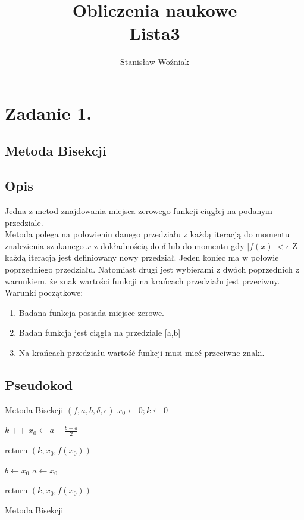 \documentclass[11pt, a4paper]{article}
\title{Obliczenia naukowe\\Lista3}
\author{Stanisław Woźniak}
\date{}
\begin{document}
    \maketitle
    \section{Zadanie 1.}
    \subsection{Metoda Bisekcji}
    \subsection{Opis}
    Jedna z metod znajdowania miejsca zerowego funkcji ciągłej na podanym przedziale.\\
    Metoda polega na połowieniu danego przedziału z każdą iteracją do momentu znalezienia szukanego $x$ z dokładnością do $\delta$ lub do momentu gdy $|f(x)| < \epsilon$
    Z każdą iteracją jest definiowany nowy przedział. Jeden koniec ma w połowie poprzedniego przedziału. Natomiast drugi jest wybierami z dwóch poprzednich z warunkiem, że znak wartości funkcji na krańcach przedziału jest przeciwny.\\
    Warunki początkowe:
    \begin{enumerate}
        \item Badana funkcja posiada miejsce zerowe.
        \item Badan funkcja jest ciągła na przedziale [a,b]
        \item Na krańcach przedziału wartość funkcji musi mieć przeciwne znaki.
    \end{enumerate}
    \subsection{Pseudokod}
    \begin{algorithm}[H]

        \underline{Metoda Bisekcji} $(f, a,b, \delta,\epsilon)$\;
        $x_{0} \leftarrow 0;k \leftarrow 0$\;
        {
            $k++$\;
            {
                $x_{0} \leftarrow a + \frac{b-a}{2}$\;
            }

            {
                return $(k, x_{0}, f(x_{0}))$\;
            }

            {
                $b \leftarrow x_{0}$\;
            }
            {
                $a \leftarrow x_{0}$\;
            }
        }
        return $(k, x_{0}, f(x_{0}))$\;
        \caption{Metoda Bisekcji}
    \end{algorithm}
    
\end{document}
